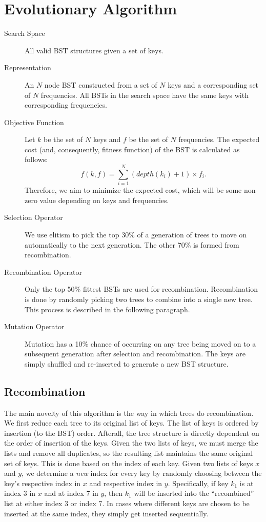 
\section{Evolutionary Algorithm}
\label{sec-algorithm}

\begin{description}
    \item[Search Space] All valid BST structures given a set of keys.
    \item[Representation] An $N$ node BST constructed from a set of $N$ keys and a corresponding set of $N$ frequencies. All BSTs in the search space have the same keys with corresponding frequencies.
    \item[Objective Function] Let $k$ be the set of $N$ keys and $f$ be the set of $N$ frequencies. The expected cost (and, consequently, fitness function) of the BST is calculated as follows:
    \begin{equation*}
        f(k, f) = \sum_{i=1}^{N} (depth(k_i) + 1) \times f_i.
    \end{equation*}
    Therefore, we aim to minimize the expected cost, which will be some non-zero value depending on keys and frequencies.
    \item[Selection Operator] We use elitism to pick the top 30\% of a generation of trees to move on automatically to the next generation. The other 70\% is formed from recombination.
    \item[Recombination Operator] Only the top 50\% fittest BSTs are used for recombination. Recombination is done by randomly picking two trees to combine into a single new tree. This process is described in the following paragraph.
    \item[Mutation Operator] Mutation has a 10\% chance of occurring on any tree being moved on to a subsequent generation after selection and recombination. The keys are simply shuffled and re-inserted to generate a new BST structure.
\end{description}

\subsection{Recombination}
The main novelty of this algorithm is the way in which trees do recombination. We first reduce each tree to its original list of keys. The list of keys is ordered by insertion (to the BST) order. Afterall, the tree structure is directly dependent on the order of insertion of the keys. Given the two lists of keys, we must merge the lists and remove all duplicates, so the resulting list maintains the same original set of keys. This is done based on the index of each key. Given two lists of keys $x$ and $y$, we determine a \emph{new} index for every key by randomly choosing between the key's respective index in $x$ and respective index in $y$. Specifically, if key $k_1$ is at index 3 in $x$ and at index 7 in $y$, then $k_1$ will be inserted into the ``recombined'' list at either index 3 or index 7. In cases where different keys are chosen to be inserted at the same index, they simply get inserted sequentially.

